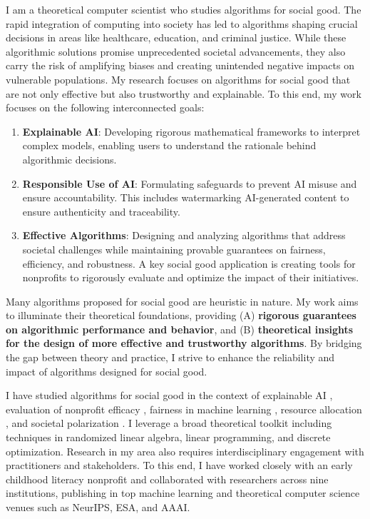 \documentclass[11pt]{article}
\begin{document}
{\setlength{\parindent}{0cm}

I am a theoretical computer scientist who studies algorithms for social good.
The rapid integration of computing into society has led to algorithms shaping crucial decisions in areas like healthcare, education, and criminal justice. While these algorithmic solutions promise unprecedented societal advancements, they also carry the risk of amplifying biases and creating unintended negative impacts on vulnerable populations. My research focuses on algorithms for social good that are not only effective but also trustworthy and explainable.
To this end, my work focuses on the following interconnected goals:
\begin{enumerate}
    \item \textbf{Explainable AI}: Developing rigorous mathematical frameworks to interpret complex models, enabling users to understand the rationale behind algorithmic decisions.
    \item \textbf{Responsible Use of AI}: Formulating safeguards to prevent AI misuse and ensure accountability. This includes watermarking AI-generated content to ensure authenticity and traceability.
    \item \textbf{Effective Algorithms}: Designing and analyzing algorithms that address societal challenges while maintaining provable guarantees on fairness, efficiency, and robustness. A key social good application is creating tools for nonprofits to rigorously evaluate and optimize the impact of their initiatives.
\end{enumerate}

Many algorithms proposed for social good are heuristic in nature. My work aims to illuminate their theoretical foundations, providing (A) \textbf{rigorous guarantees on algorithmic performance and behavior}, and (B) \textbf{theoretical insights for the design of more effective and trustworthy algorithms}.
By bridging the gap between theory and practice, I strive to enhance the reliability and impact of algorithms designed for social good.

I have studied algorithms for social good in the context of explainable AI \cite{musco2024leverage,liu2024kernel}, evaluation of nonprofit efficacy \cite{witter2024benchmarking}, fairness in machine learning \cite{rosenblatt2023counterfactual,witter2024fairlyuncertain}, resource allocation \cite{hellerstein2022local,witter2024i,witter2024minimizing}, and societal polarization \cite{musco2022quantify}. I leverage a broad theoretical toolkit including techniques in randomized linear algebra, linear programming, and discrete optimization. Research in my area also requires interdisciplinary engagement with practitioners and stakeholders. To this end, I have worked closely with an early childhood literacy nonprofit and collaborated with researchers across nine institutions, publishing in top machine learning and theoretical computer science venues such as NeurIPS, ESA, and AAAI.

}
\end{document}
